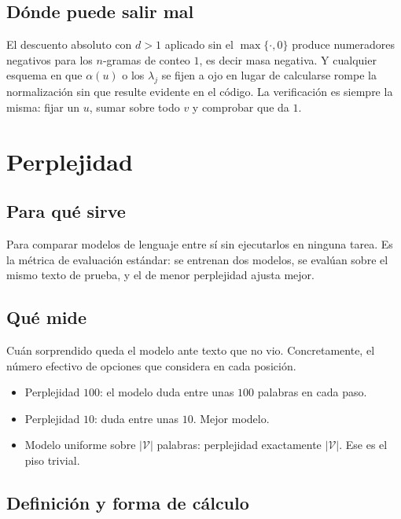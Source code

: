 \documentclass[11pt,letterpaper]{article}
\newcommand{\Vocab}{\mathcal{V}}
\begin{document}
\subsection{Dónde puede salir mal}

El descuento absoluto con $d>1$ aplicado sin el $\max\{\cdot,0\}$ produce
numeradores negativos para los $n$-gramas de conteo $1$, es decir masa negativa.
Y cualquier esquema en que $\alpha(u)$ o los $\lambda_j$ se fijen a ojo en lugar
de calcularse rompe la normalización sin que resulte evidente en el código. La
verificación es siempre la misma: fijar un $u$, sumar sobre todo $v$ y comprobar
que da $1$.

\section{Perplejidad}

\subsection{Para qué sirve}

Para comparar modelos de lenguaje entre sí sin ejecutarlos en ninguna
tarea. Es la métrica de evaluación estándar: se entrenan dos modelos,
se evalúan sobre el mismo texto de prueba, y el de menor perplejidad
ajusta mejor.

\subsection{Qué mide}

Cuán sorprendido queda el modelo ante texto que no vio. Concretamente,
el número efectivo de opciones que considera en cada posición.

\begin{itemize}[itemsep=0.1em]
  \item Perplejidad $100$: el modelo duda entre unas $100$ palabras en
        cada paso.
  \item Perplejidad $10$: duda entre unas $10$. Mejor modelo.
  \item Modelo uniforme sobre $|\Vocab|$ palabras: perplejidad
        exactamente $|\Vocab|$. Ese es el piso trivial.
\end{itemize}

\subsection{Definición y forma de cálculo}
\end{document}
